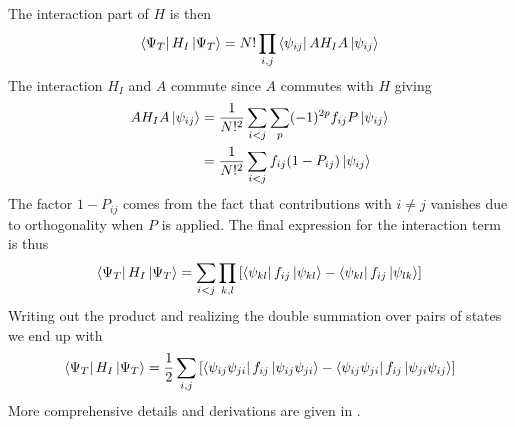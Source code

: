         The interaction part of $H$ is then
            \begin{equation}
                \bra{\Psi_T}H_I\ket{\Psi_T} = N!\prod_{i,j}\bra{\psi_{ij}}AH_IA\ket{\psi_{ij}}
            \end{equation}
        The interaction $H_I$ and $A$ commute since $A$ commutes with $H$
        giving
            \begin{align}
                AH_IA\ket{\psi_{ij}} &= \frac{1}{N!^2}\sum_{i<j}\sum_{p}
                (-1)^{2p}f_{ij} P\ket{\psi_{ij}} \\
                &= \frac{1}{N!^2}\sum_{i<j}f_{ij}(1-P_{ij})\ket{\psi_{ij}}
            \end{align}
        The factor $1-P_{ij}$ comes from the fact that contributions with
        $i\neq j$ vanishes due to orthogonality when $P$ is applied. The final
        expression for the interaction term is thus
            \begin{equation}
                \bra{\Psi_T}H_I\ket{\Psi_T} =
                \sum_{i<j}\prod_{k,l}\left[\bra{\psi_{kl}}f_{ij}\ket{\psi_{kl}} -
                \bra{\psi_{kl}}f_{ij}\ket{\psi_{lk}}\right]
            \end{equation}
        Writing out the product and realizing the double summation over pairs
        of states we end up with
            \begin{equation}
                \bra{\Psi_T}H_I\ket{\Psi_T} = \frac{1}{2}
                \sum_{i,j}\left[\bra{\psi_{ij}\psi_{ji}}f_{ij}\ket{\psi_{ij}\psi_{ji}} -
                \bra{\psi_{ij}\psi_{ji}}f_{ij}\ket{\psi_{ji}\psi_{ij}}\right]
            \end{equation}
        More comprehensive details and derivations are given in
        \cite{compphysThijssen,basicMB}.

